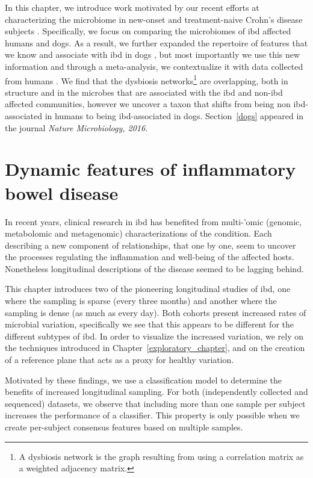 \documentclass[12pt,chapterheads]{ucsd}
\begin{document}
In this chapter, we introduce work motivated by our recent efforts at 
characterizing the microbiome in new-onset and treatment-naive Crohn's disease 
subjects \cite{RN154}. Specifically, we focus on comparing the microbiomes of 
\gls{ibd} affected humans and dogs. As a result, we further expanded the 
repertoire of features that we know and associate with \gls{ibd} in dogs 
\cite{RN153}, but most importantly we use this new information and through a 
meta-analysis, we contextualize it with data collected from humans 
\cite{RN154}.  We find that the dysbiosis networks\footnote{A dysbiosis network 
is the graph resulting from using a correlation matrix as a weighted adjacency 
matrix.} are overlapping, both in structure and in the microbes that are 
associated with the \gls{ibd} and non-\gls{ibd} affected communities, however 
we uncover a taxon that shifts from being non \gls{ibd}-associated in humans to 
being \gls{ibd}-associated in dogs.  Section~\ref{dogs} appeared in the journal 
\textsl{Nature Microbiology, 2016}.



\chapter{Dynamic features of inflammatory bowel disease}\label{chapter_ibds}

In recent years, clinical research in \gls{ibd} has benefited from multi-'omic 
(genomic\cite{RN4217}, metabolomic\cite{RN4264} and metagenomic\cite{RN4263}) 
characterizations of the condition. Each describing a new component of 
relationships, that one by one, seem to uncover the processes regulating the 
inflammation and well-being of the affected hosts. Nonetheless longitudinal 
descriptions of the disease seemed to be lagging behind.

This chapter introduces two of the pioneering longitudinal studies of 
\gls{ibd}, one where the sampling is sparse (every three months) and another 
where the sampling is dense (as much as every day). Both cohorts present 
increased rates of microbial variation, specifically we see that this appears 
to be different for the different subtypes of \gls{ibd}. In order to visualize 
the increased variation, we rely on the techniques introduced in 
Chapter~\ref{exploratory_chapter}, and on the creation of a reference plane 
that acts as a proxy for healthy variation.

Motivated by these findings, we use a classification model to determine the 
benefits of increased longitudinal sampling. For both (independently collected 
and sequenced) datasets, we observe that including more than one sample per 
subject increases the performance of a classifier. This property is only 
possible when we create per-subject consensus features based on multiple 
samples.
\end{document}
